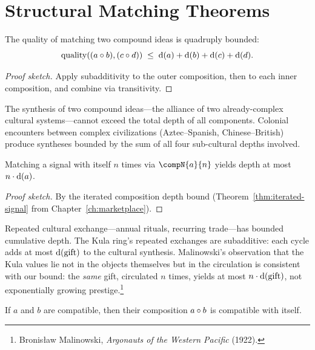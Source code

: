 \section{Structural Matching Theorems}
\label{sec:ch12-structural}

\begin{theorem}
\label{thm:double-bound}
The quality of matching two compound ideas is quadruply bounded:
\[
  \operatorname{quality}((a \circ b), (c \circ d))
  \;\le\;
  \operatorname{d}(a) + \operatorname{d}(b) + \operatorname{d}(c) + \operatorname{d}(d).
\]
\end{theorem}

\begin{proof}[Proof sketch]
Apply subadditivity to the outer composition, then to each inner
composition, and combine via transitivity.
\end{proof}

The synthesis of two compound ideas---the alliance of two already-complex
cultural systems---cannot exceed the total depth of all components.  Colonial
encounters between complex civilizations (Aztec--Spanish, Chinese--British)
produce syntheses bounded by the sum of all four sub-cultural depths involved.

\begin{theorem}
\label{thm:iterated-match}
Matching a signal with itself $n$ times via $\compN{a}{n}$ yields depth at
most $n \cdot \operatorname{d}(a)$.
\end{theorem}

\begin{proof}[Proof sketch]
By the iterated composition depth bound (Theorem~\ref{thm:iterated-signal}
from Chapter~\ref{ch:marketplace}).
\end{proof}

Repeated cultural exchange---annual rituals, recurring trade---has bounded
cumulative depth.  The Kula ring's repeated exchanges are subadditive: each
cycle adds at most $\operatorname{d}(\text{gift})$ to the cultural synthesis.
Malinowski's observation that the Kula values lie not in the objects
themselves but in the circulation is consistent with our bound: the \emph{same}
gift, circulated $n$ times, yields at most $n \cdot \operatorname{d}(\text{gift})$,
not exponentially growing prestige.\footnote{Bronisław Malinowski,
\textit{Argonauts of the Western Pacific} (1922).}

\begin{theorem}
\label{thm:synthesis-self}
If $a$ and $b$ are compatible, then their composition $a \circ b$ is
compatible with itself.
\end{theorem}

